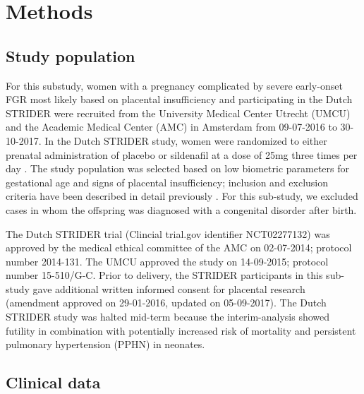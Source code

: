 \documentclass[authordate, empirical]{jote-new-article}
\begin{document}
	\section{Methods}







	\subsection{Study population}



	For this substudy, women with a pregnancy complicated by severe early-onset FGR most likely based on placental insufficiency and participating in the Dutch STRIDER were recruited from the University Medical Center Utrecht (UMCU) and the Academic Medical Center (AMC) in Amsterdam from 09-07-2016 to 30-10-2017. In the Dutch STRIDER study, women were randomized to either prenatal administration of placebo or sildenafil at a dose of 25mg three times per day \parencites{Pels2020}{Pels2017}. The study population was selected based on low biometric parameters for gestational age and signs of placental insufficiency; inclusion and exclusion criteria have been described in detail previously \parencites{Pels2020}{Pels2017}. For this sub-study, we excluded cases in whom the offspring was diagnosed with a congenital disorder after birth.



	The Dutch STRIDER trial (Clincial trial.gov identifier NCT02277132) was approved by the medical ethical committee of the AMC on 02-07-2014; protocol number 2014-131. The UMCU approved the study on 14-09-2015; protocol number 15-510/G-C. Prior to delivery, the STRIDER participants in this sub-study gave additional written informed consent for placental research (amendment approved on 29-01-2016, updated on 05-09-2017). The Dutch STRIDER study was halted mid-term because the interim-analysis showed futility in combination with potentially increased risk of mortality and persistent pulmonary hypertension (PPHN) in neonates.







	\subsection{Clinical data }
\end{document}
